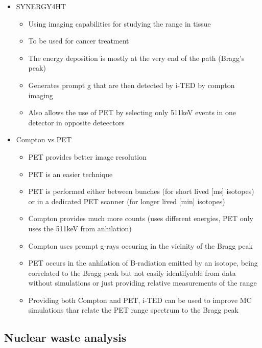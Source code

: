 \begin{itemize}
    \item SYNERGY4HT
    \begin{itemize}
        \item Using imaging capabilities for studying the range in tissue
        \item To be used for cancer treatment 
        \item The energy deposition is mostly at the very end of the path (Bragg's peak)
        \item Generates prompt g that are then detected by i-TED by compton imaging
        \item Also allows the use of PET by selecting only 511keV events in one detector in opposite deteectors
    \end{itemize}
    \item Compton vs PET
    \begin{itemize}
        \item PET provides better image resolution
        \item PET is an easier technique
        \item PET is performed either between bunches (for short lived [ms] isotopes) or in a dedicated PET scanner (for longer lived [min] isotopes)
        \item Compton provides much more counts (uses different energies, PET only uses the 511keV from anhilation)
        \item Compton uses prompt g-rays occuring in the vicinity of the Bragg peak
        \item PET occurs in the anhilation of B-radiation emitted by an isotope, being correlated to the Bragg peak but not easily identifyable from data without simulations or just providing relative measurements of the range
        \item Providing both Compton and PET, i-TED can be used to improve MC simulations thar relate the PET range spectrum to the Bragg peak
    \end{itemize}
\end{itemize}

\subsection{Nuclear waste analysis}

